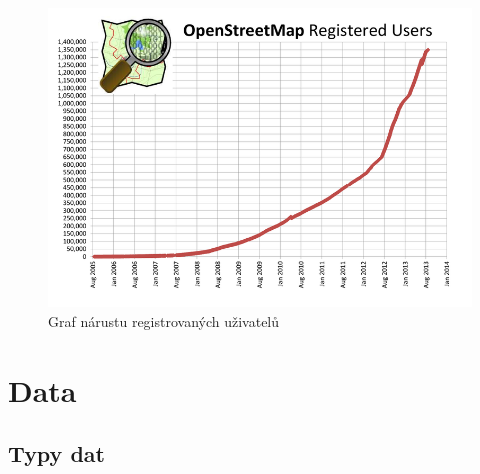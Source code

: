 \documentclass[11pt,a4paper,titlepage,oneside]{book}
\begin{document}
                

		\begin{figure}[!h]
			\begin{center}
				\includegraphics[width=12cm]{obrazky/osm_stat_users.png}
				\caption{Graf nárustu registrovaných uživatelů}
			\end{center}
		\end{figure}


	\section{Data}
		\subsection{Typy dat}




\end{document}
